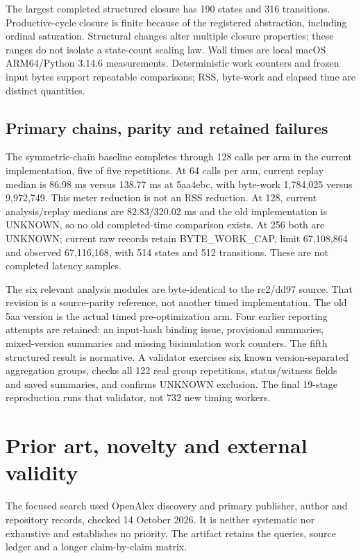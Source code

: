 \documentclass[11pt,a4paper]{article}
\begin{document}
The largest completed structured closure has 190 states and 316 transitions. Productive-cycle closure is finite because of the registered abstraction, including ordinal saturation. Structural changes alter multiple closure properties; these ranges do not isolate a state-count scaling law. Wall times are local macOS ARM64/Python 3.14.6 measurements. Deterministic work counters and frozen input bytes support repeatable comparisons; RSS, byte-work and elapsed time are distinct quantities.

\subsection{Primary chains, parity and retained failures}
The symmetric-chain baseline completes through 128 calls per arm in the current implementation, five of five repetitions. At 64 calls per arm, current replay median is 86.98 ms versus 138.77 ms at 5aa4ebc, with byte-work 1,784,025 versus 9,972,749. This meter reduction is not an RSS reduction. At 128, current analysis/replay medians are 82.83/320.02 ms and the old implementation is UNKNOWN, so no old completed-time comparison exists. At 256 both are UNKNOWN; current raw records retain BYTE\_WORK\_CAP, limit 67,108,864 and observed 67,116,168, with 514 states and 512 transitions. These are not completed latency samples.

The six relevant analysis modules are byte-identical to the rc2/dd97 source. That revision is a source-parity reference, not another timed implementation. The old 5aa version is the actual timed pre-optimization arm. Four earlier reporting attempts are retained: an input-hash binding issue, provisional summaries, mixed-version summaries and missing bisimulation work counters. The fifth structured result is normative. A validator exercises six known version-separated aggregation groups, checks all 122 real group repetitions, status/witness fields and saved summaries, and confirms UNKNOWN exclusion. The final 19-stage reproduction runs that validator, not 732 new timing workers.

\section{Prior art, novelty and external validity}
The focused search used OpenAlex discovery and primary publisher, author and repository records, checked 14 October 2026. It is neither systematic nor exhaustive and establishes no priority. The artifact retains the queries, source ledger and a longer claim-by-claim matrix.
\end{document}
